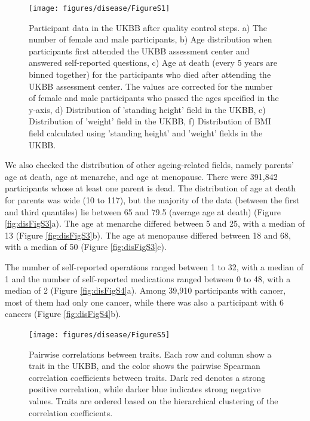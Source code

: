 \documentclass[12pt,twoside]{unicam}
\begin{document}
\begin{figure}

{\centering \texttt{[image: figures/disease/FigureS1]} 

}

\caption[Participant data in the UKBB after quality control steps.]{Participant data in the UKBB after quality control steps. a) The number of female and male participants, b) Age distribution when participants first attended the UKBB assessment center and answered self-reported questions, c) Age at death (every 5 years are binned together) for the participants who died after attending the UKBB assessment center. The values are corrected for the number of female and male participants who passed the ages specified in the y-axis, d) Distribution of 'standing height' field in the UKBB, e) Distribution of 'weight' field in the UKBB, f) Distribution of BMI field calculated using 'standing height' and 'weight' fields in the UKBB.}\label{fig:disFigS1}
\end{figure}

We also checked the distribution of other ageing-related fields, namely parents' age at death, age at menarche, and age at menopause. There were 391,842 participants whose at least one parent is dead. The distribution of age at death for parents was wide (10 to 117), but the majority of the data (between the first and third quantiles) lie between 65 and 79.5 (average age at death) (Figure \ref{fig:disFigS3}a). The age at menarche differed between 5 and 25, with a median of 13 (Figure \ref{fig:disFigS3}b). The age at menopause differed between 18 and 68, with a median of 50 (Figure \ref{fig:disFigS3}c).

The number of self-reported operations ranged between 1 to 32, with a median of 1 and the number of self-reported medications ranged between 0 to 48, with a median of 2 (Figure \ref{fig:disFigS4}a). Among 39,910 participants with cancer, most of them had only one cancer, while there was also a participant with 6 cancers (Figure \ref{fig:disFigS4}b).

\begin{figure}

{\centering \texttt{[image: figures/disease/FigureS5]} 

}

\caption[Pairwise correlations between traits.]{Pairwise correlations between traits. Each row and column show a trait in the UKBB, and the color shows the pairwise Spearman correlation coefficients between traits. Dark red denotes a strong positive correlation, while darker blue indicates strong negative values. Traits are ordered based on the hierarchical clustering of the correlation coefficients.}\label{fig:disFigS5}
\end{figure}
\end{document}
